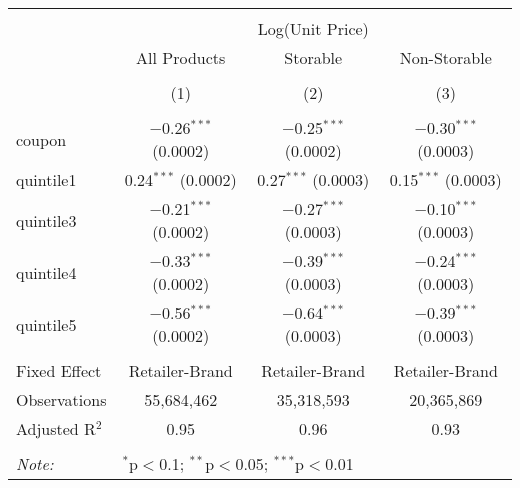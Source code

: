 
\begin{table}[!htbp] \centering 
  \caption{} 
  \label{tab:overallSavings} 
\begin{tabular}{@{\extracolsep{5pt}}lccc} 
\\[-1.8ex]\hline 
\hline \\[-1.8ex] 
 & \multicolumn{3}{c}{Log(Unit Price)} \\ 
\cline{2-4} 
 & All Products & Storable & Non-Storable \\ 
\\[-1.8ex] & (1) & (2) & (3)\\ 
\hline \\[-1.8ex] 
 coupon & $-$0.26$^{***}$ (0.0002) & $-$0.25$^{***}$ (0.0002) & $-$0.30$^{***}$ (0.0003) \\ 
  quintile1 & 0.24$^{***}$ (0.0002) & 0.27$^{***}$ (0.0003) & 0.15$^{***}$ (0.0003) \\ 
  quintile3 & $-$0.21$^{***}$ (0.0002) & $-$0.27$^{***}$ (0.0003) & $-$0.10$^{***}$ (0.0003) \\ 
  quintile4 & $-$0.33$^{***}$ (0.0002) & $-$0.39$^{***}$ (0.0003) & $-$0.24$^{***}$ (0.0003) \\ 
  quintile5 & $-$0.56$^{***}$ (0.0002) & $-$0.64$^{***}$ (0.0003) & $-$0.39$^{***}$ (0.0003) \\ 
 \hline \\[-1.8ex] 
Fixed Effect & Retailer-Brand & Retailer-Brand & Retailer-Brand \\ 
Observations & 55,684,462 & 35,318,593 & 20,365,869 \\ 
Adjusted R$^{2}$ & 0.95 & 0.96 & 0.93 \\ 
\hline 
\hline \\[-1.8ex] 
\textit{Note:}  & \multicolumn{3}{l}{$^{*}$p$<$0.1; $^{**}$p$<$0.05; $^{***}$p$<$0.01} \\ 
\end{tabular} 
\end{table} 
